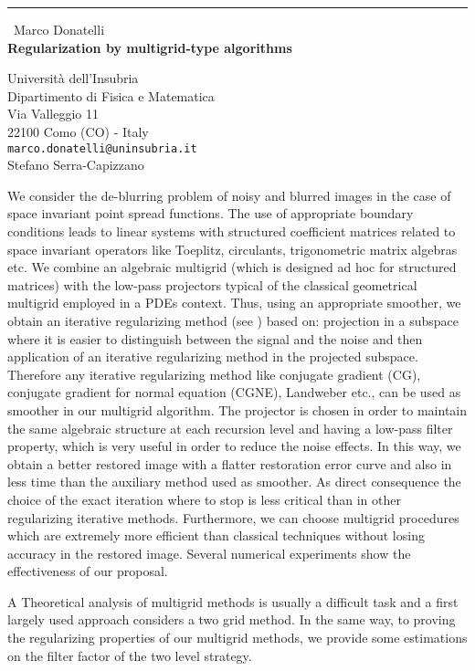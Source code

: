 \documentclass{report}
\begin{document}
\begin{center}
\rule{6in}{1pt} \
{\large Marco Donatelli \\
{\bf Regularization by multigrid-type algorithms}}

Universit\`{a} dell'Insubria \\ Dipartimento di Fisica e Matematica \\ Via Valleggio 11 \\ 22100 Como (CO) - Italy
\\
{\tt marco.donatelli@uninsubria.it}\\
Stefano Serra-Capizzano\end{center}

We consider the de-blurring problem of noisy and blurred images in
the case of space invariant point spread functions. The use of
appropriate boundary conditions leads to linear systems with
structured coefficient matrices related to space invariant
operators like Toeplitz, circulants, trigonometric matrix algebras
etc. We combine an algebraic multigrid (which is designed ad hoc
for structured matrices) with the low-pass projectors typical of
the classical geometrical multigrid employed in a PDEs context.
Thus, using an appropriate smoother, we obtain an iterative
regularizing method (see \cite{mgmreg, Dphd}) based on: projection
in a subspace where it is easier to distinguish between the signal
and the noise and then application of an iterative regularizing
method in the projected subspace. Therefore any iterative
regularizing method like conjugate gradient (CG), conjugate
gradient for normal equation (CGNE), Landweber etc., can be used
as smoother in our multigrid algorithm. The projector is chosen in
order to maintain the same algebraic structure at each recursion
level and having a low-pass filter property, which is very useful
in order to reduce the noise effects. In this way, we obtain a
better restored image with a flatter restoration error curve and
also in less time than the auxiliary method used as smoother. As
direct consequence the choice of the exact iteration where to stop
is less critical than in other regularizing iterative methods.
Furthermore, we can choose multigrid procedures which are
extremely more efficient than classical techniques without losing
accuracy in the restored image. Several numerical experiments show
the effectiveness of our proposal.

A Theoretical analysis of multigrid methods is usually a difficult
task and a first largely used approach considers a two grid
method. In the same way, to proving the regularizing properties of
our multigrid methods, we provide some estimations on the filter
factor of the two level strategy.
\end{document}
